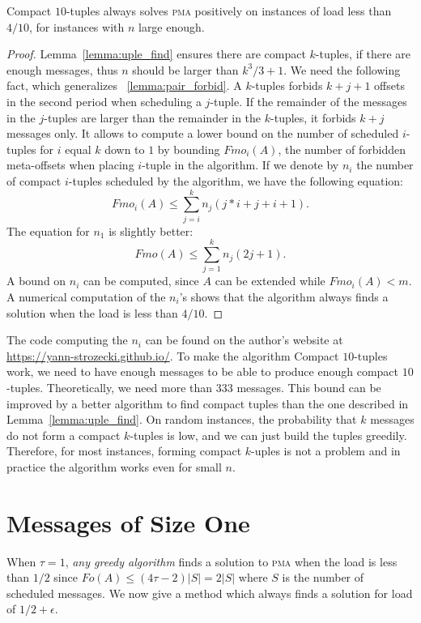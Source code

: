 \documentclass[a4paper,UKenglish,cleveref, autoref, thm-restate]{lipics-v2019}
\newcommand\pma{\textsc{pma}\xspace}
\begin{document}
\begin{theorem}
Compact $10$-tuples always solves \pma positively on instances of load less than $4/10$, for instances with $n$ large enough.
\end{theorem}
\begin{proof}
Lemma~\ref{lemma:uple_find} ensures there are compact $k$-tuples, if there are enough messages,
thus $n$ should be larger than $k^3/3 +1$. 
We need the following fact, which generalizes ~\ref{lemma:pair_forbid}. A $k$-tuples forbids $k+j+1$ offsets in the second period when scheduling a $j$-tuple. If the remainder of the messages in the $j$-tuples are larger than the remainder in the $k$-tuples, it forbids $k+j$ messages only.
It allows to compute a lower bound on the number of scheduled $i$-tuples for $i$ equal $k$ down to $1$ by bounding $Fmo_i(A)$, the number of forbidden meta-offsets when placing $i$-tuple in the algorithm.
If we denote by $n_i$ the number of compact $i$-tuples scheduled by the algorithm,
we have the following equation:  $$ Fmo_i(A) \leq \displaystyle{\sum_{j=i}^k n_j(j*i + j + i+ 1)}.$$
The equation for $n_1$ is slightly better: 
$$ Fmo(A) \leq \displaystyle{\sum_{j=1}^k n_j(2j + 1)}.$$
A bound on $n_i$ can be computed, since $A$ can be extended while $Fmo_i(A) < m$. A numerical computation of the $n_i$'s shows that the algorithm always finds a solution when the load is less than $4/10$.
\end{proof}

The code computing the $n_i$ can be found on the author's website at \url{https://yann-strozecki.github.io/}.
To make the algorithm Compact $10$-tuples work, we need to have enough messages to be able to
produce enough compact $10$-tuples. Theoretically, we need more than $333$ messages. This bound can be improved
by a better algorithm to find compact tuples than the one described in Lemma~\ref{lemma:uple_find}. On random instances, the probability that $k$ messages do not form a compact $k$-tuples is low, and we can just build the tuples greedily. Therefore, for most instances, forming compact $k$-uples is not a problem and in practice the algorithm works even for small $n$.
 


\section{Messages of Size One} \label{sec:small}

When $\tau = 1$, \emph{any greedy algorithm} finds a solution to \pma when the load is less than $1/2$ since $Fo(A) \leq (4\tau -2)|S| = 2|S|$ where $S$ is the number of scheduled messages. We now give a method which always finds a solution for load of $1/2 + \epsilon$.
\end{document}
